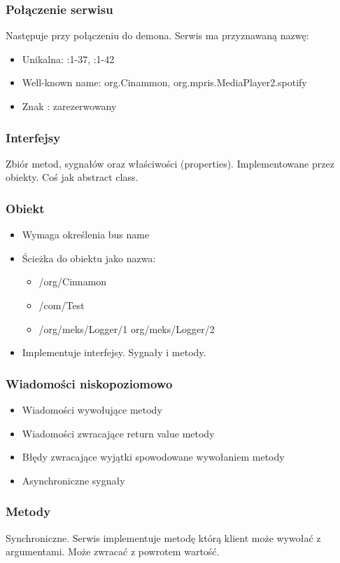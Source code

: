 \begin{frame}
    \frametitle{Połączenie serwisu}
    Następuje przy połączeniu do demona.
    Serwis ma przyznawaną nazwę:
    \begin{itemize}
        \item Unikalna: :1-37, :1-42
        \item Well-known name: org.Cinammon, org.mpris.MediaPlayer2.spotify
        \item Znak : zarezerwowany
    \end{itemize}
\end{frame}


\begin{frame}
    \frametitle{Interfejsy}
    Zbiór metod, sygnałów oraz właściwości (properties).
    Implementowane przez obiekty. 
    Coś jak abstract class.
\end{frame}

\begin{frame}
    \frametitle{Obiekt}
    \begin{itemize}
        \item Wymaga określenia bus name 
        \item Ścieżka do obiektu jako nazwa:
        \begin{itemize}
            \item /org/Cinnamon 
            \item /com/Test
            \item /org/meks/Logger/1 org/meks/Logger/2 
        \end{itemize}
        \item Implementuje interfejsy. Sygnały i metody. 
    \end{itemize}
\end{frame}

\begin{frame}
    \frametitle{Wiadomości niskopoziomowo}
    \begin{itemize}
        \item Wiadomości wywołujące metody
        \item Wiadomości zwracające return value metody
        \item Błędy zwracające wyjątki spowodowane wywołaniem metody
        \item Asynchroniczne sygnały
    \end{itemize}
\end{frame}

\begin{frame}
    \frametitle{Metody}
    Synchroniczne. Serwis implementuje metodę którą
    klient może wywołać z argumentami. Może zwracać
    z powrotem wartość.
\end{frame}

